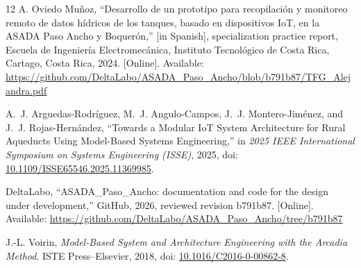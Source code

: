 \documentclass[conference]{IEEEtran}
\begin{document}
\begin{thebibliography}{12}
A. Oviedo Mu\~{n}oz, ``Desarrollo de un prototipo para recopilaci\'{o}n y monitoreo remoto de datos h\'{i}dricos de los tanques, basado en dispositivos IoT, en la ASADA Paso Ancho y Boquer\'{o}n,'' [in Spanish], specialization practice report, Escuela de Ingenier\'{i}a Electromec\'{a}nica, Instituto Tecnol\'{o}gico de Costa Rica, Cartago, Costa Rica, 2024. [Online]. Available: \url{https://github.com/DeltaLabo/ASADA_Paso_Ancho/blob/b791b87/TFG_Alejandra.pdf}

A.~J. Arguedas-Rodr\'{i}guez, M.~J. Angulo-Campos, J.~J. Montero-Jim\'{e}nez, and J.~J. Rojas-Hern\'{a}ndez, ``Towards a Modular IoT System Architecture for Rural Aqueducts Using Model-Based Systems Engineering,'' in \emph{2025 IEEE International Symposium on Systems Engineering (ISSE)}, 2025, doi: \url{10.1109/ISSE65546.2025.11369985}.

DeltaLabo, ``ASADA\_Paso\_Ancho: documentation and code for the design under development,'' GitHub, 2026, reviewed revision b791b87. [Online]. Available: \url{https://github.com/DeltaLabo/ASADA_Paso_Ancho/tree/b791b87}

J.-L. Voirin, \emph{Model-Based System and Architecture Engineering with the Arcadia Method}. ISTE Press--Elsevier, 2018, doi: \url{10.1016/C2016-0-00862-8}.

\end{thebibliography}
\end{document}
